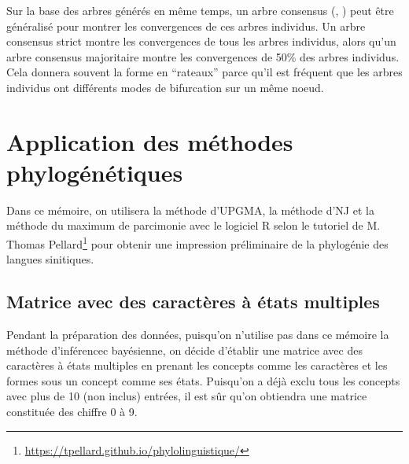 \documentclass{scrbook}
\newcounter{c}[subsubsection]
\begin{document}
\begin{sloppypar}
Sur la base des arbres générés en même temps, un arbre consensus (\cite[24]{judd2008plant}, \cite[17]{pellardfamily}) peut être généralisé pour montrer les convergences de ces arbres individus. Un arbre consensus strict montre les convergences de tous les arbres individus, alors qu'un arbre consensus majoritaire montre les convergences de 50\% des arbres individus. Cela donnera souvent la forme en ``rateaux'' parce qu'il est fréquent que les arbres individus ont différents modes de bifurcation sur un même noeud. 

\section{Application des méthodes phylogénétiques}
Dans ce mémoire, on utilisera la méthode d'UPGMA, la méthode d'NJ et la méthode du maximum de parcimonie avec le logiciel R selon le tutoriel de M. Thomas Pellard\footnote{\url{https://tpellard.github.io/phylolinguistique/}} pour obtenir une impression préliminaire de la phylogénie des langues sinitiques.  

\subsection{Matrice avec des caractères à états multiples}
Pendant la préparation des données, puisqu'on n'utilise pas dans ce mémoire la méthode d'inférencec bayésienne, on décide d'établir une matrice avec des caractères à états multiples en prenant les concepts comme les caractères et les formes sous un concept comme ses états. Puisqu'on a déjà exclu tous les concepts avec plus de 10 (non inclus) entrées, il est sûr qu'on obtiendra une matrice constituée des chiffre 0 à 9.


\end{sloppypar}
\end{document}
